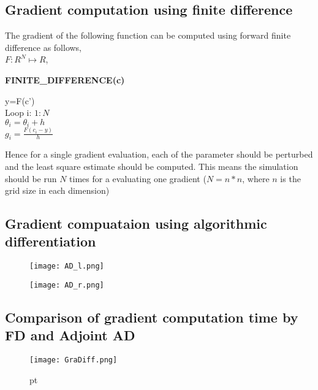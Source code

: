 \documentclass[10pt,a4paper]{report}
\begin{document}
\subsection{Gradient computation using finite difference}

The gradient of the following function can be computed using forward finite difference as follows,\\
$F:R^{N} \mapsto R$,
\begin{algorithm}[h]
\caption{\textbf{FINITE\_DIFFERENCE(c)}}
  y=F(c')\\
  Loop i: $1:N$\\
  \Indp $\theta_i = \theta_i +h$\\
  $g_{i} = \frac{F(c_{i}-y)}{h}$
  
\end{algorithm}

Hence for a single gradient evaluation, each of the parameter should be perturbed and the least square estimate should be computed. This means the simulation should be run $N$ times for a evaluating one gradient ($N = n*n$, where $n$ is the grid size in each dimension) 


\subsection{Gradient compuataion using algorithmic differentiation}

\begin{figure}[H]
\begin{minipage}[t]{0.5\linewidth}
\centering
\texttt{[image: AD\_l.png]}
\caption{}
\label{fig:side:a}
\end{minipage}%
\begin{minipage}[t]{0.5\linewidth}
\centering
\texttt{[image: AD\_r.png]}
\caption{}
\label{fig:side:b}
\end{minipage}
\end{figure}


\subsection{Comparison of gradient computation time by FD and Adjoint AD}
\begin{figure}[h]
\begin{center}
\texttt{[image: GraDiff.png]} 
\caption{}  pt
\label{fig:GradDiff}
\end{center}
\end{figure}
\end{document}
